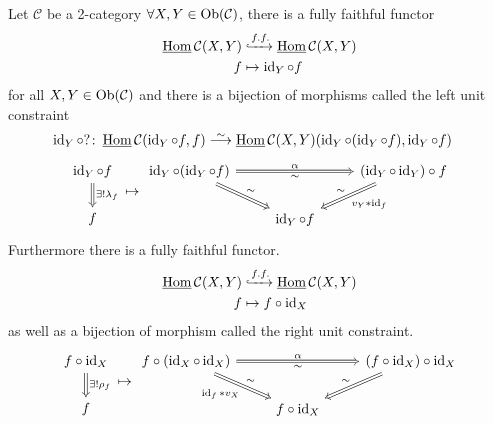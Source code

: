 \begin{construction}
\label{left_right_unit_constraints}
	Let $\mathcal{ C }$ be a 2-category $ \forall X , Y \in \operatorname{Ob} ( \mathcal{ C } ) $, there is a fully faithful functor 	
	\begin{align*}
		\operatorname{\underline{Hom}}{\mathcal{ C } } ( X , Y ) 
		&\xhookrightarrow{f.f.}
		\operatorname{\underline{Hom}}{ \mathcal{ C }} ( X, Y )
		\\ 
		f
		&\mapsto
		\operatorname{id}_Y \circ f		 
	\end{align*}
	for all $ X , Y \in \operatorname{Ob}( \mathcal{ C } )$ and there is a bijection of morphisms called the left unit constraint
	\begin{align*}
		\id_Y \circ ? \colon \twoHom{\mathcal{ C} } ( \id_Y \circ f 	, f )
		&\isomorphism 
		\twoHom{ \mathcal{C } } ( X , Y )( \id_Y \circ ( \id_Y \circ f ) , \id_Y \circ f )
	\end{align*}
	\[
	\begin{tikzcd}
		\id_Y \circ f
		\ar[d, Rightarrow, " \exists ! \lambda_f"]
		\\
		f
	\end{tikzcd}
	\mapsto
	\begin{tikzcd}
		\id_Y \circ ( \id_Y \circ f )
		\ar[rr, Rightarrow, " \alpha" , " \sim"']
		\ar[rd, Rightarrow, " \sim"]
		&&
		(\id_Y \circ \id_Y ) \circ f 
		\ar[ld, Rightarrow, "v_Y * \id_f", "\sim"']
		\\
		&
		\id_Y \circ f
	\end{tikzcd}
	\]
	Furthermore there is a fully faithful functor.
	\begin{align*}
		\operatorname{\underline{Hom}}{\mathcal{ C } } ( X , Y ) 
		&\xhookrightarrow{f.f.}
		\operatorname{\underline{Hom}}{ \mathcal{ C }} ( X, Y )
		\\ 
		f
		&\mapsto
		f \circ \operatorname{id}_X		 
	\end{align*}
	as well as a bijection of morphism called the right unit constraint.
	\[
	\begin{tikzcd}
		f \circ \id_X
		\ar[d, Rightarrow, " \exists ! \rho_f"]
		\\
		f
	\end{tikzcd}
	\mapsto
	\begin{tikzcd}
		f \circ ( \id_X \circ \id_X )
		\ar[rr, Rightarrow, " \alpha" , " \sim"']
		\ar[rd, Rightarrow, "\id_f*v_X"' ," \sim"]
		&&
		( f \circ \id_X ) \circ \id_X  
		\ar[ld, Rightarrow, "\sim"']
		\\
		&
		f \circ \id_X 
	\end{tikzcd}
	\]
\end{construction}

